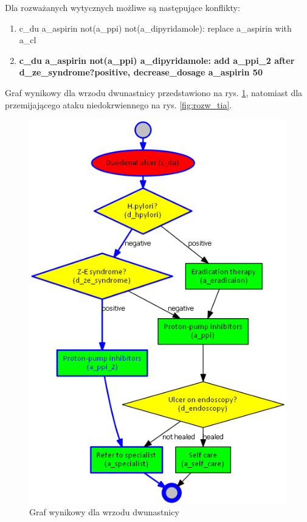 \newpage
Dla rozważanych wytycznych możliwe są następujące konflikty:
\begin{enumerate}
\item c\_du a\_aspirin not(a\_ppi) not(a\_dipyridamole): replace a\_aspirin with a\_cl
\item \textbf{c\_du a\_aspirin not(a\_ppi) a\_dipyridamole: add a\_ppi\_2 after d\_ze\_synd\-rome?positive, decrease\_dosage a\_aspirin 50}
\end{enumerate}

Graf wynikowy dla wrzodu dwunastnicy przedstawiono na rys. \ref{fig:rozw_du}, natomiast dla przemijającego ataku niedokrwiennego na rys. \ref{fig:rozw_tia}.

\begin{figure}[H]
\centering
\includegraphics[scale=0.5]{img/rozwiazanie1du.png}
\caption{Graf wynikowy dla wrzodu dwunastnicy}
\label{fig:rozw_du}
\end{figure}
